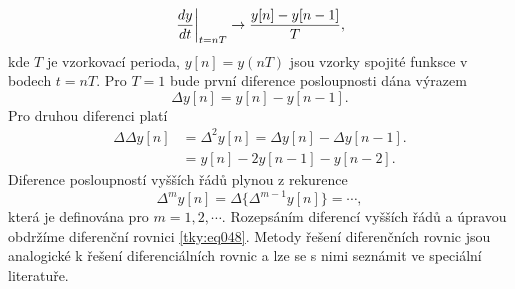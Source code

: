       
      \begin{equation}\label{tky:eq049}
        \left.\dfrac{d y}{d t}\right\rvert_{t=nT} \rightarrow \dfrac{y[n] - y[n-1]}{T}, 
      \end{equation}
      kde \(T\) je vzorkovací perioda, \(y[n] = y(nT)\) jsou vzorky spojité funksce v bodech \(t =
      nT\). Pro \(T=1\) bude první diference posloupnosti dána výrazem
      \begin{equation}\label{tky:eq050}
        \Delta y[n] = y[n] - y[n-1].
      \end{equation}
      Pro druhou diferenci platí
      \begin{align}\label{tky:eq051}
        \Delta\Delta y[n] 
          &= \Delta^2 y[n] = \Delta y[n] - \Delta y[n-1].  \nonumber \\
          &= y[n] - 2y[n-1] - y[n-2].
      \end{align}
      Diference posloupností vyšších řádů plynou z rekurence
      \begin{equation}\label{tky:eq052}
        \Delta^m y[n] = \Delta\{\Delta^{m-1}y[n]\} = \cdots,
      \end{equation}
      která je definována pro \(m = 1, 2, \cdots \). Rozepsáním diferencí vyšších řádů a úpravou
      obdržíme diferenční rovnici \ref{tky:eq048}. Metody řešení diferenčních rovnic jsou analogické
      k řešení diferenciálních rovnic a lze se s nimi seznámit ve speciální literatuře. 

      

